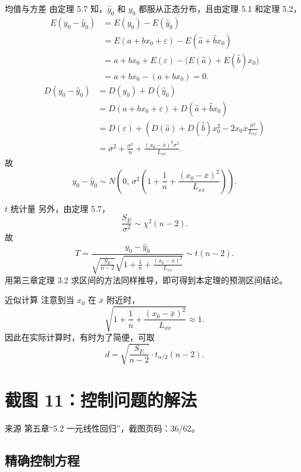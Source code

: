 \documentclass[UTF8,zihao=-4,fontset=fandol]{ctexart}
\begin{document}
\begin{keybox}{均值与方差}
由定理 5.7 知，$\hat{y}_0$ 和 $y_0$ 都服从正态分布，且由定理 5.1 和定理 5.2，
\[
\begin{aligned}
E(y_0-\hat{y}_0)
&=E(y_0)-E(\hat{y}_0) \\
&=E(a+bx_0+\varepsilon)-E(\hat{a}+\hat{b}x_0) \\
&=a+bx_0+E(\varepsilon)-\bigl(E(\hat{a})+E(\hat{b})x_0\bigr) \\
&=a+bx_0-(a+bx_0)=0.
\end{aligned}
\]
\[
\begin{aligned}
D(y_0-\hat{y}_0)
&=D(y_0)+D(\hat{y}_0) \\
&=D(a+bx_0+\varepsilon)+D(\hat{a}+\hat{b}x_0) \\
&=D(\varepsilon)+
\left(D(\hat{a})+D(\hat{b})x_0^2
-2x_0\bar{x}\frac{\sigma^2}{L_{xx}}\right) \\
&=\sigma^2+\frac{\sigma^2}{n}
+\frac{(x_0-\bar{x})^2\sigma^2}{L_{xx}}.
\end{aligned}
\]
故
\[
y_0-\hat{y}_0
\sim
N\left(
0,\,
\sigma^2\left(
1+\frac{1}{n}+\frac{(x_0-\bar{x})^2}{L_{xx}}
\right)
\right).
\]
\end{keybox}

\begin{keybox}{$t$ 统计量}
另外，由定理 5.7，
\[
\frac{S_E}{\sigma^2}\sim \chi^2(n-2).
\]
故
\[
T=
\frac{y_0-\hat{y}_0}
{
\sqrt{\frac{S_E}{n-2}}
\sqrt{1+\frac{1}{n}+\frac{(x_0-\bar{x})^2}{L_{xx}}}
}
\sim t(n-2).
\]
用第三章定理 3.2 求区间的方法同样推导，即可得到本定理的预测区间结论。
\end{keybox}

\begin{warnbox}{近似计算}
注意到当 $x_0$ 在 $\bar{x}$ 附近时，
\[
\sqrt{1+\frac{1}{n}+\frac{(x_0-\bar{x})^2}{L_{xx}}}\approx 1.
\]
因此在实际计算时，有时为了简便，可取
\[
d=
\sqrt{\frac{S_E}{n-2}}\cdot t_{\alpha/2}(n-2).
\]
\end{warnbox}

\section{截图 11：控制问题的解法}

\begin{sourcebox}{来源}
第五章“5.2 一元线性回归”，截图页码：36/62。
\end{sourcebox}

\subsection{精确控制方程}
\end{document}
